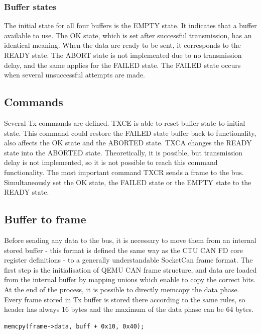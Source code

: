 \documentclass{ctuthesis}
\begin{document}
  \subsubsection{Buffer states}
  The initial state for all four buffers is the EMPTY state. It indicates that a buffer available to use. The OK state, which is set after successful transmission, has an identical meaning. When the data are ready to be sent, it corresponds to the READY state. The ABORT state is not implemented due to no transmission delay, and the same applies for the FAILED state. The FAILED state occurs when several unsuccessful attempts are made.
 
 \subsection{Commands}
  Several Tx commands are defined. TXCE is able to reset buffer state to initial state. This command could restore the FAILED state buffer back to functionality, also affects the OK state and the ABORTED state. TXCA changes the READY state into the ABORTED state. Theoretically, it is possible, but transmission delay is not implemented, so it is not possible to reach this command functionality. The most important command TXCR sends a frame to the bus. Simultaneously set the OK state, the FAILED state or the EMPTY state to the READY state.
 
 \subsection{Buffer to frame}
  Before sending any data to the bus, it is necessary to move them from an internal stored buffer - this format is defined the same way as the CTU CAN FD core register definitions - to a generally understandable SocketCan frame format. The first step is the initialisation of QEMU CAN frame structure, and data are loaded from the internal buffer by mapping unions which enable to copy the correct bits. At the end of the process, it is possible to directly memcopy the data phase. Every frame stored in Tx buffer is stored there according to the same rules, so header has always 16 bytes and the maximum of the data phase can be 64 bytes.
  \begin{verbatim}memcpy(frame->data, buff + 0x10, 0x40);\end{verbatim}
 
\end{document}
